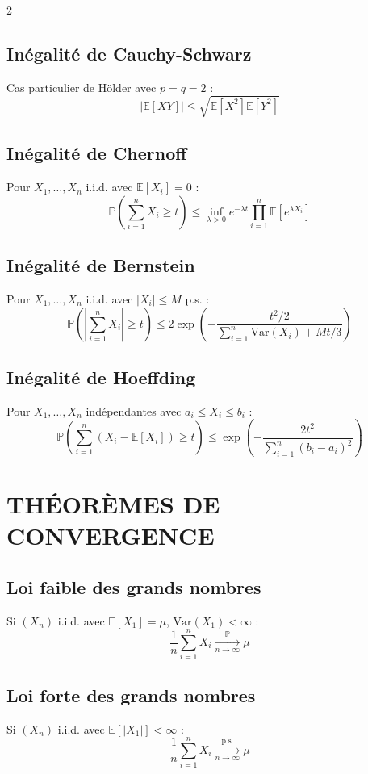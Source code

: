 \documentclass[10pt,a4paper]{article}
\begin{document}
\begin{multicols}{2}
\subsection*{Inégalité de Cauchy-Schwarz}
Cas particulier de Hölder avec $p = q = 2$ :
\[
|\mathbb{E}[XY]| \leq \sqrt{\mathbb{E}[X^2] \mathbb{E}[Y^2]}
\]

\subsection*{Inégalité de Chernoff}
Pour $X_1, \ldots, X_n$ i.i.d. avec $\mathbb{E}[X_i] = 0$ :
\[
\mathbb{P}\left(\sum_{i=1}^n X_i \geq t\right) \leq \inf_{\lambda > 0} e^{-\lambda t} \prod_{i=1}^n \mathbb{E}[e^{\lambda X_i}]
\]

\subsection*{Inégalité de Bernstein}
Pour $X_1, \ldots, X_n$ i.i.d. avec $|X_i| \leq M$ p.s. :
\[
\mathbb{P}\left(\left|\sum_{i=1}^n X_i\right| \geq t\right) \leq 2 \exp\left(-\frac{t^2/2}{\sum_{i=1}^n \text{Var}(X_i) + Mt/3}\right)
\]

\subsection*{Inégalité de Hoeffding}
Pour $X_1, \ldots, X_n$ indépendantes avec $a_i \leq X_i \leq b_i$ :
\[
\mathbb{P}\left(\sum_{i=1}^n (X_i - \mathbb{E}[X_i]) \geq t\right) \leq \exp\left(-\frac{2t^2}{\sum_{i=1}^n (b_i - a_i)^2}\right)
\]

\section*{THÉORÈMES DE CONVERGENCE}

\subsection*{Loi faible des grands nombres}
Si $(X_n)$ i.i.d. avec $\mathbb{E}[X_1] = \mu$, $\text{Var}(X_1) < \infty$ :
\[
\frac{1}{n}\sum_{i=1}^n X_i \xrightarrow[n \to \infty]{\mathbb{P}} \mu
\]

\subsection*{Loi forte des grands nombres}
Si $(X_n)$ i.i.d. avec $\mathbb{E}[|X_1|] < \infty$ :
\[
\frac{1}{n}\sum_{i=1}^n X_i \xrightarrow[n \to \infty]{\text{p.s.}} \mu
\]


\end{multicols}
\end{document}
